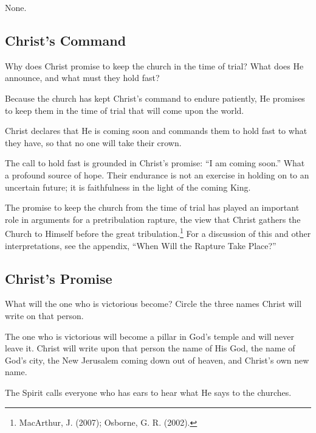 None.

\subsection{Christ's Command}

\begin{ScriptureBox2}{Why does Christ promise to keep the church in the time of trial? What does He announce, and what must they hold fast?}
\item[3:10] Because the church has kept Christ's command to endure patiently, He promises to keep them in the time of trial that will come upon the world.

\item[3:11] Christ declares that He is coming soon and commands them to hold fast to what they have, so that no one will take their crown.
\end{ScriptureBox2}

The call to hold fast is grounded in Christ's promise: ``I am coming soon.'' What a profound source of hope. Their endurance is not an exercise in holding on to an uncertain future; it is faithfulness in the light of the coming King.

The promise to keep the church from the time of trial has played an important role in arguments for a pretribulation rapture, the view that Christ gathers the Church to Himself before the great tribulation.\footnote{MacArthur, J. (2007); Osborne, G. R. (2002).} For a discussion of this and other interpretations, see the appendix, ``When Will the Rapture Take Place?''

\subsection{Christ's Promise}

\begin{ScriptureBox2}{What will the one who is victorious become? Circle the three names Christ will write on that person.}
\item[3:12] The one who is victorious will become a pillar in God's temple and will never leave it. Christ will write upon that person the name of His God, the name of God's city, the New Jerusalem coming down out of heaven, and Christ's own new name.

\item[3:13] The Spirit calls everyone who has ears to hear what He says to the churches.
\end{ScriptureBox2}

